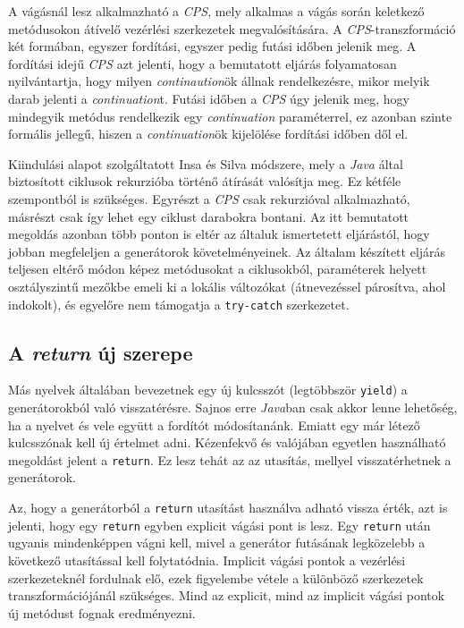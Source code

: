 A vágásnál lesz alkalmazható a \textit{CPS}, mely alkalmas a vágás során keletkező metódusokon átívelő vezérlési szerkezetek megvalósítására. A \textit{CPS}-transzformáció két formában, egyszer fordítási, egyszer pedig futási időben jelenik meg. A fordítási idejű \textit{CPS} azt jelenti, hogy a bemutatott eljárás folyamatosan nyilvántartja, hogy milyen \textit{continaution}ök állnak rendelkezésre, mikor melyik darab jelenti a \textit{continuation}t. Futási időben a \textit{CPS} úgy jelenik meg, hogy mindegyik metódus rendelkezik egy \textit{continuation} paraméterrel, ez azonban szinte formális jellegű, hiszen a \textit{continuation}ök kijelölése fordítási időben dől el.

Kiindulási alapot szolgáltatott Insa és Silva \citeyear{IterToRec} módszere, mely a \textit{Java} által biztosított ciklusok rekurzióba történő átírását valósítja meg. Ez kétféle szempontból is szükséges. Egyrészt a \textit{CPS} csak rekurzióval alkalmazható, másrészt csak így lehet egy ciklust darabokra bontani. Az itt bemutatott megoldás azonban több ponton is eltér az általuk ismertetett eljárástól, hogy jobban megfeleljen a generátorok követelményeinek. Az általam készített eljárás teljesen eltérő módon képez metódusokat a ciklusokból, paraméterek helyett osztályszintű mezőkbe emeli ki a lokális változókat (átnevezéssel párosítva, ahol indokolt), és egyelőre nem támogatja a \texttt{try-catch} szerkezetet.

\subsection{A \textit{return} új szerepe}

Más nyelvek általában bevezetnek egy új kulcsszót (legtöbbször \texttt{yield}) a generátorokból való visszatérésre. Sajnos erre \textit{Java}ban csak akkor lenne lehetőség, ha a nyelvet és vele együtt a fordítót módosítanánk. Emiatt egy már létező kulcsszónak kell új értelmet adni. Kézenfekvő és valójában egyetlen használható megoldást jelent a \texttt{return}. Ez lesz tehát az az utasítás, mellyel visszatérhetnek a generátorok.

Az, hogy a generátorból a \texttt{return} utasítást használva adható vissza érték, azt is jelenti, hogy egy \texttt{return} egyben explicit vágási pont is lesz. Egy \texttt{return} után ugyanis mindenképpen vágni kell, mivel a generátor futásának legközelebb a következő utasítással kell folytatódnia. Implicit vágási pontok a vezérlési szerkezeteknél fordulnak elő, ezek figyelembe vétele a különböző szerkezetek transzformációjánál szükséges. Mind az explicit, mind az implicit vágási pontok új metódust fognak eredményezni.